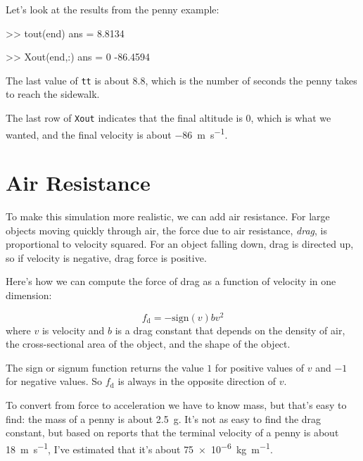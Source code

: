 Let's look at the results from the penny example:

\begin{code}
    >> tout(end)
    ans =
    8.8134
    
    >> Xout(end,:)
    ans =
             0  -86.4594
\end{code}

The last value of \lstinline{tt} is about 8.8, which is the number of seconds the penny takes to reach the sidewalk.

The last row of \lstinline{Xout} indicates that the final altitude is 0, which is what we wanted, and the final velocity is about \SI{-86}{\meter \per \second}.


\section{Air Resistance}
\label{air_resistance}


To make this simulation more realistic, we can add air resistance.
For large objects moving quickly through air, the force due to air resistance, \emph{drag}, is proportional to velocity squared.
For an object falling down, drag is
directed up, so if velocity is negative, drag force is positive.


Here's how we can compute the force of drag as a function of velocity in one dimension:

\begin{equation*}
    f_\mathrm{d} = -\mathrm{sign}(v) b v^2
\end{equation*}
where $v$ is velocity and
$b$ is a drag constant that depends on the density of
air, the cross-sectional area of the object, and the shape
of the object.

The sign or signum function returns the value $1$ for positive values of
$v$ and $-1$ for negative values.  So $f_\mathrm{d}$ is always in the opposite direction of $v$.


To convert from force to acceleration we have to know mass, but that's easy to find: the mass of a penny is about \SI{2.5}{\gram}.  It's not as easy to find the drag constant, but based on reports that the terminal velocity of a penny is about \SI{18}{\meter \per \second}, I've estimated that it's about \SI{75e-6}{\kilogram \per \meter}.

